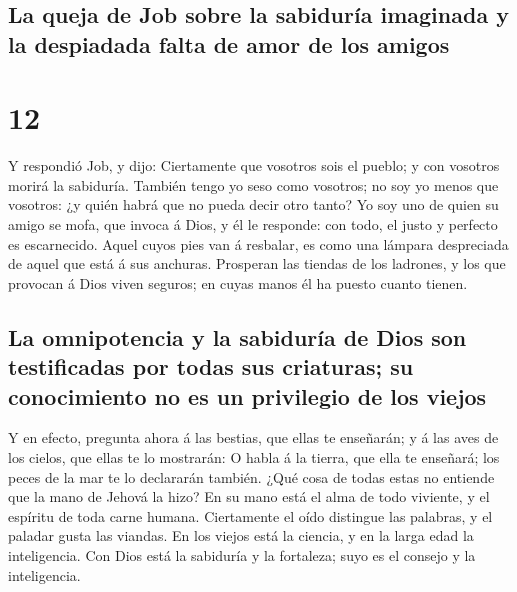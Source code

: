 \hypertarget{la-queja-de-job-sobre-la-sabiduruxeda-imaginada-y-la-despiadada-falta-de-amor-de-los-amigos}{%
\subsection{La queja de Job sobre la sabiduría imaginada y la despiadada
falta de amor de los
amigos}\label{la-queja-de-job-sobre-la-sabiduruxeda-imaginada-y-la-despiadada-falta-de-amor-de-los-amigos}}

\hypertarget{section-11}{%
\section{12}\label{section-11}}

 Y respondió Job, y dijo:  Ciertamente que
vosotros sois el pueblo; y con vosotros morirá la sabiduría.
 También tengo yo seso como vosotros; no soy yo menos que
vosotros: ¿y quién habrá que no pueda decir otro tanto? 
Yo soy uno de quien su amigo se mofa, que invoca á Dios, y él le
responde: con todo, el justo y perfecto es escarnecido. 
Aquel cuyos pies van á resbalar, es como una lámpara despreciada de
aquel que está á sus anchuras.  Prosperan las tiendas de
los ladrones, y los que provocan á Dios viven seguros; en cuyas manos él
ha puesto cuanto tienen.

\hypertarget{la-omnipotencia-y-la-sabiduruxeda-de-dios-son-testificadas-por-todas-sus-criaturas-su-conocimiento-no-es-un-privilegio-de-los-viejos}{%
\subsection{La omnipotencia y la sabiduría de Dios son testificadas por
todas sus criaturas; su conocimiento no es un privilegio de los
viejos}\label{la-omnipotencia-y-la-sabiduruxeda-de-dios-son-testificadas-por-todas-sus-criaturas-su-conocimiento-no-es-un-privilegio-de-los-viejos}}

 Y en efecto, pregunta ahora á las bestias, que ellas te
enseñarán; y á las aves de los cielos, que ellas te lo mostrarán:
 O habla á la tierra, que ella te enseñará; los peces de
la mar te lo declararán también.  ¿Qué cosa de todas estas
no entiende que la mano de Jehová la hizo?  En su mano
está el alma de todo viviente, y el espíritu de toda carne humana.
 Ciertamente el oído distingue las palabras, y el paladar
gusta las viandas.  En los viejos está la ciencia, y en
la larga edad la inteligencia.  Con Dios está la
sabiduría y la fortaleza; suyo es el consejo y la inteligencia.

